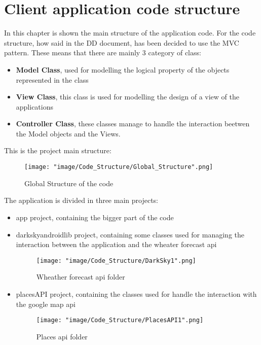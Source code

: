 \chapter{Client application code structure}

In this chapter is shown the main structure of the application code.
For the code structure, how said in the DD document, has been decided to use the MVC pattern. These means that there are mainly 3 category of class:

\begin{itemize}
\item \textbf{Model Class}, used for modelling the logical property of the objects represented in the class 

\item \textbf{View Class}, this class is used for modelling the design of a view of the applications

\item \textbf{Controller Class}, these classes manage to handle the interaction beetwen the Model objects and the Views.
\end{itemize}

This is the project main structure:

\begin{figure}[H]
\begin{center}
\texttt{[image: "image/Code\_Structure/Global\_Structure".png]}
\caption{Global Structure of the code}
\end{center}
\end{figure}

The application is divided in three main projects:

\begin{itemize}
\item app project, containing the bigger part of the code

\item darkskyandroidlib project, containing some classes used for managing the interaction between the application and the wheater forecast api
\begin{figure}[H]
\begin{center}
\texttt{[image: "image/Code\_Structure/DarkSky1".png]}
\caption{Wheather forecast api folder}
\end{center}
\end{figure}

\item placesAPI project, containing the classes used for handle the interaction with the google map api
\begin{figure}[H]
\begin{center}
\texttt{[image: "image/Code\_Structure/PlacesAPI1".png]}
\caption{Places api folder}
\end{center}
\end{figure}
\end{itemize}

